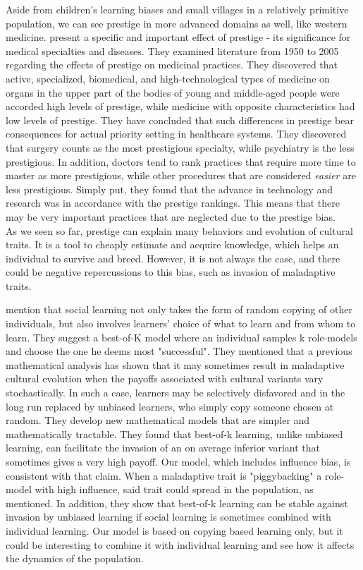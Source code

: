 \documentclass[12pt]{extarticle}
\begin{document}
Aside from children's learning biases and small villages in a relatively primitive population, we can see prestige in more advanced domains as well, like western medicine.\citet{medical_prestige} present a specific and important effect of prestige - its significance for medical specialties and diseases.
They examined literature from 1950 to 2005 regarding the effects of prestige on medicinal practices. They discovered that active, specialized, biomedical, and high-technological types of medicine on organs in the upper part of the bodies of young and middle-aged people were accorded high levels of prestige, while medicine with opposite characteristics had low levels of prestige. They have concluded that such differences in prestige bear consequences for actual priority setting in healthcare systems. They discovered that surgery counts as the most prestigious specialty, while psychiatry is the less prestigious. In addition, doctors tend to rank practices that require more time to master as more prestigious, while other procedures that are considered \textit{easier} are less prestigious. Simply put, they found that the advance in technology and research was in accordance with the prestige rankings.
This means that there may be very important practices that are neglected due to the prestige bias.\\

As we seen so far, prestige can explain many behaviors and evolution of cultural traits. It is a tool to cheaply estimate and acquire knowledge, which helps an individual to survive and breed. However, it is not always the case, and there could be negative repercussions to this bias, such as invasion of maladaptive traits.

\citet{best_of_k} mention that social learning not only takes the form of random copying of other individuals, but also involves learners’ choice of what to learn and from whom to learn. They suggest a best-of-K model where an individual samples k role-models and choose the one he deems most "successful". They mentioned that a previous mathematical analysis has shown that it may sometimes result in maladaptive cultural evolution when the payoffs associated with cultural variants vary stochastically. In such a case, learners may be selectively disfavored and in the long run replaced by unbiased learners, who simply copy someone chosen at random. They develop new mathematical models that are simpler and mathematically tractable. They found that best-of-k learning, unlike unbiased learning, can facilitate the invasion of an on average inferior variant that sometimes gives a very high payoff. Our model, which includes influence bias, is consistent with that claim. When a maladaptive trait is "piggybacking" a role-model with high influence, said trait could spread in the population, as mentioned. In addition, they show that best-of-k learning can be stable against invasion by unbiased learning if social learning is sometimes combined with individual learning. Our model is based on copying based learning only, but it could be interesting to combine it with individual learning and see how it affects the dynamics of the population.
\end{document}

